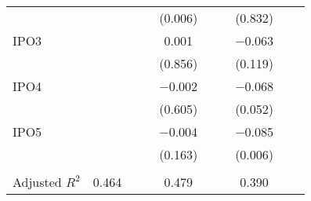 \begin{longtable}{l*{9}{c}}
                    &            &            &            &     (0.006)&            &            &     (0.832)&            &            \\
\addlinespace
IPO3                &            &            &            &       0.001&            &            &    $-$0.063&            &            \\
                    &            &            &            &     (0.856)&            &            &     (0.119)&            &            \\
\addlinespace
IPO4                &            &            &            &    $-$0.002&            &            &    $-$0.068&            &            \\
                    &            &            &            &     (0.605)&            &            &     (0.052)&            &            \\
\addlinespace
IPO5                &            &            &            &    $-$0.004&            &            &    $-$0.085&            &            \\
                    &            &            &            &     (0.163)&            &            &     (0.006)&            &            \\
\\
Adjusted $ R^{2}$   &       0.464&            &            &       0.479&            &            &       0.390&            &            \\
\bottomrule
\end{longtable}
